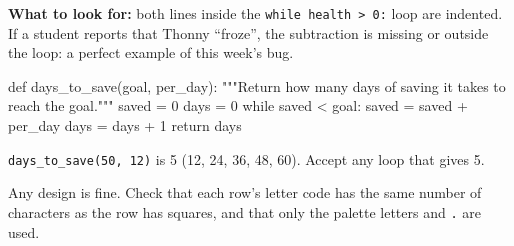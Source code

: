 \begin{answer}
\textbf{What to look for:} both lines inside the \texttt{while health > 0:} loop are indented. If a student reports that Thonny
\enquote{froze}, the subtraction is missing or outside the loop: a perfect example of this week's bug.
\end{answer}

\begin{answer}
\begin{pycode}
def days_to_save(goal, per_day):
    """Return how many days of saving it takes to reach the goal."""
    saved = 0
    days = 0
    while saved < goal:
        saved = saved + per_day
        days = days + 1
    return days
\end{pycode}
\texttt{days\_to\_save(50, 12)} is 5 (12, 24, 36, 48, 60). Accept any loop that gives 5.
\end{answer}

\begin{answer}
Any design is fine. Check that each row's letter code has the same number of characters as the row has squares,
and that only the palette letters and \texttt{.} are used.
\end{answer}
